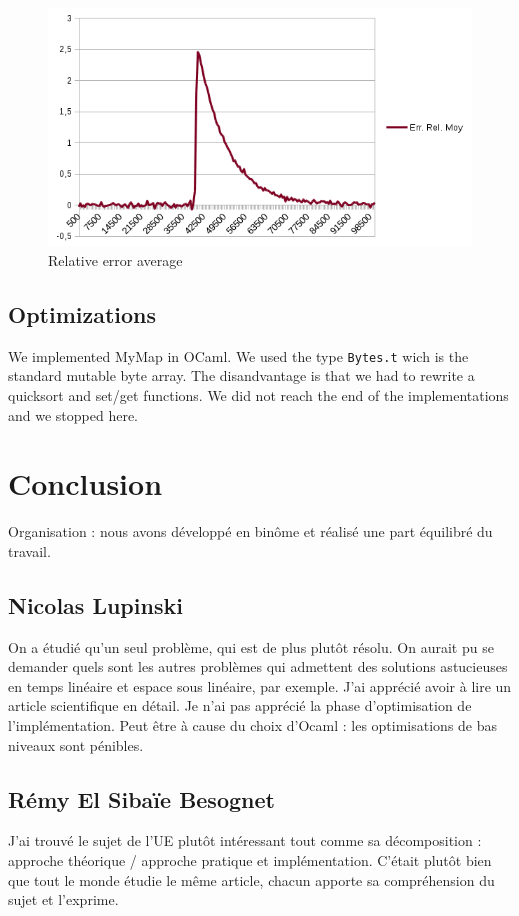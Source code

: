 \documentclass[12pt]{article}
\begin{document}
\begin{figure}[h!]
   \includegraphics[scale=1]{./moy2.png}
   \caption{\label{figerr}Relative error average}
\end{figure}


\subsection{Optimizations}

We implemented MyMap in OCaml. We used the type \texttt{Bytes.t} wich
is the standard mutable byte array. The disandvantage is that we had
to rewrite a quicksort and set/get functions. We did not reach the end
of the implementations and we stopped here.


\section{Conclusion}

Organisation : nous avons développé en binôme et réalisé une part
équilibré du travail.

\subsection{Nicolas Lupinski} 
On a étudié qu'un seul problème, qui est de plus plutôt résolu. On
aurait pu se demander quels sont les autres problèmes qui admettent
des solutions astucieuses en temps linéaire et espace sous linéaire,
par exemple.  J'ai apprécié avoir à lire un article scientifique en
détail. Je n'ai pas apprécié la phase d'optimisation de
l'implémentation. Peut être à cause du choix d'Ocaml : les
optimisations de bas niveaux sont pénibles.
  

\subsection{Rémy El Sibaïe Besognet}
J'ai trouvé le sujet de l'UE plutôt intéressant tout comme sa
décomposition : approche théorique / approche pratique et
implémentation. C'était plutôt bien que tout le monde étudie le même
article, chacun apporte sa compréhension du sujet et l'exprime.
\end{document}
